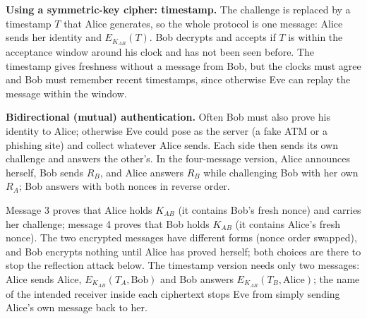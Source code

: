 \textbf{Using a symmetric-key cipher: timestamp.} The challenge is replaced by a timestamp $T$ that Alice generates, so the whole protocol is one message: Alice sends her identity and $E_{K_{AB}}(T)$. Bob decrypts and accepts if $T$ is within the acceptance window around his clock and has not been seen before. The timestamp gives freshness without a message from Bob, but the clocks must agree and Bob must remember recent timestamps, since otherwise Eve can replay the message within the window.
\begin{center}
\hspace{1.2cm}%
\end{center}

\textbf{Bidirectional (mutual) authentication.} Often Bob must also prove his identity to Alice; otherwise Eve could pose as the server (a fake ATM or a phishing site) and collect whatever Alice sends. Each side then sends its own challenge and answers the other's. In the four-message version, Alice announces herself, Bob sends $R_B$, and Alice answers $R_B$ while challenging Bob with her own $R_A$; Bob answers with both nonces in reverse order.
\begin{center}
\end{center}
Message 3 proves that Alice holds $K_{AB}$ (it contains Bob's fresh nonce) and carries her challenge; message 4 proves that Bob holds $K_{AB}$ (it contains Alice's fresh nonce). The two encrypted messages have different forms (nonce order swapped), and Bob encrypts nothing until Alice has proved herself; both choices are there to stop the reflection attack below. The timestamp version needs only two messages: Alice sends Alice, $E_{K_{AB}}(T_A, \text{Bob})$ and Bob answers $E_{K_{AB}}(T_B, \text{Alice})$; the name of the intended receiver inside each ciphertext stops Eve from simply sending Alice's own message back to her.

